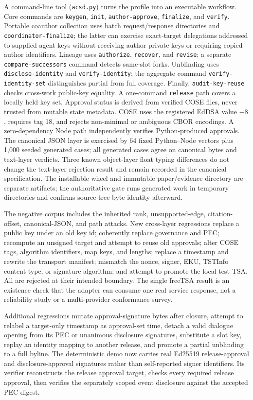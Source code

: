 \documentclass[conference,compsoc]{IEEEtran}
\begin{document}
A command-line tool (\texttt{acsd.py}) turns the profile into an executable
workflow. Core commands are \texttt{keygen}, \texttt{init},
\texttt{author-approve}, \texttt{finalize}, and \texttt{verify}. Portable
coauthor collection uses batch request/response directories and
\texttt{coordinator-finalize}; the latter can exercise exact-target
delegations addressed to supplied agent keys without receiving author private
keys or requiring copied author identifiers. Lineage uses \texttt{authorize},
\texttt{recover}, and \texttt{revise}; a separate \texttt{compare-successors} command detects
same-slot forks. Unblinding uses \texttt{disclose-identity} and
\texttt{verify-identity}; the aggregate command
\texttt{verify-identity-set} distinguishes partial from full coverage.
Finally, \texttt{audit-key-reuse} checks cross-work public-key equality. A
one-command \texttt{release} path covers a locally held key set. Approval
status is derived
from verified COSE files, never trusted from mutable state metadata. COSE uses
the registered EdDSA value $-8$, requires tag 18, and rejects non-minimal or
ambiguous CBOR encodings. A zero-dependency Node path independently verifies
Python-produced approvals. The canonical JSON layer is exercised by 64 fixed
Python--Node vectors plus 1,000 seeded generated cases; all generated cases
agree on canonical bytes and text-layer verdicts. Three known object-layer
float typing differences do not change the text-layer rejection result and
remain recorded in the canonical specification. The installable wheel and
immutable paper/evidence directory are separate artifacts; the authoritative
gate runs generated work in temporary directories and confirms source-tree
byte identity afterward.

The negative corpus includes the inherited rank, unsupported-edge,
citation-offset, canonical-JSON, and path attacks. New cross-layer regressions
replace a public key under an old key id; coherently replace governance and PEC;
recompute an unsigned target and attempt to reuse old approvals; alter COSE tags,
algorithm identifiers, map keys, and lengths; replace a timestamp and rewrite
the transport manifest; mismatch the nonce, signer, EKU, TSTInfo content type,
or signature algorithm; and attempt to promote the local test TSA. All are
rejected at their intended boundary. The single freeTSA result is an existence
check that the adapter can consume one real service response, not a reliability
study or a multi-provider conformance survey.

Additional regressions mutate approval-signature bytes after closure, attempt
to relabel a target-only timestamp as approval-set time, detach a valid dialogue
opening from its PEC or unanimous disclosure signatures, substitute a slot
key, replay an identity mapping to another release, and promote a partial
unblinding to a full byline. The deterministic demo now carries real Ed25519
release-approval and disclosure-approval signatures rather than self-reported
signer identifiers. Its verifier reconstructs the release approval target,
checks every required release approval, then verifies the separately scoped
event disclosure against the accepted PEC digest.
\end{document}
